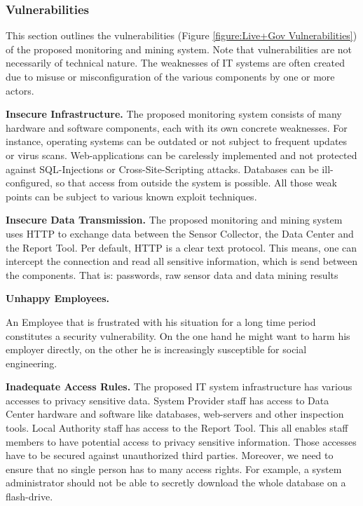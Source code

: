 \documentclass[runningheads,a4paper]{llncs}
\newenvironment{LGContent}
{ \par\color{blue} \it \small }
{ \par }
\begin{document}
\begin{LGContent}
\subsubsection{Vulnerabilities}
\label{subsubsection:Vulnerabilities}
This section outlines the vulnerabilities (Figure \ref{figure:Live+Gov Vulnerabilities}) of the proposed monitoring and mining system.
Note that vulnerabilities are not necessarily of technical nature.
The weaknesses of IT systems are often created due to misuse or misconfiguration of the various components by one or more actors.



\textbf{Insecure Infrastructure.}
The proposed monitoring system consists of many hardware and software components, each with its own concrete weaknesses.
For instance, operating systems can be outdated or not subject to frequent updates or virus scans.
Web-applications can be carelessly implemented and not protected against SQL-Injections or Cross-Site-Scripting attacks.
Databases can be ill-configured, so that access from outside the system is possible.
All those weak points can be subject to various known exploit techniques.

\textbf{Insecure Data Transmission.}
The proposed monitoring and mining system uses HTTP to exchange data between the Sensor Collector, the Data Center and the Report Tool.
Per default, HTTP is a clear text protocol.
This means, one can intercept the connection and read all sensitive information, which is send between the components.
That is: passwords, raw sensor data and data mining results

\textbf{Unhappy Employees.}

An Employee that is frustrated with his situation for a long time
period constitutes a security vulnerability. On the one hand he might
want to harm his employer directly, on the other he is increasingly
susceptible for social engineering.

\textbf{Inadequate Access Rules.}
The proposed IT system infrastructure has various accesses to privacy sensitive data.
System Provider staff has access to Data Center hardware and software like databases, web-servers and other inspection tools.
Local Authority staff has access to the Report Tool.
This all enables staff members to have potential access to privacy sensitive information.
Those accesses have to be secured against unauthorized third parties.
Moreover, we need to ensure that no single person has to many access rights.
For example, a system administrator should not be able to secretly download the whole database on a flash-drive.



\end{LGContent}
\end{document}
